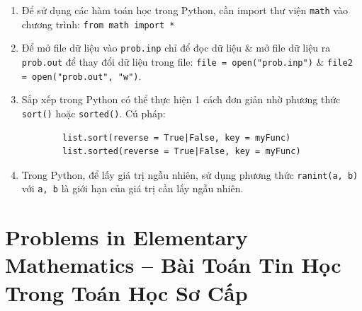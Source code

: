 \documentclass{article}
\begin{document}
\begin{enumerate}
	\item Để sử dụng các hàm toán học trong Python, cần import thư viện \texttt{math} vào chương trình: \texttt{from math import *}
	\item Để mở file dữ liệu vào \texttt{prob.inp} chỉ để đọc dữ liệu \& mở file dữ liệu ra \texttt{prob.out} để thay đổi dữ liệu trong file: \texttt{file = open("prob.inp")} \& \texttt{file2 = open("prob.out", "w")}.
	\item Sắp xếp trong Python có thể thực hiện 1 cách đơn giản nhờ phương thức \texttt{sort()} hoặc \texttt{sorted()}. Cú pháp:
	\begin{verbatim}
		list.sort(reverse = True|False, key = myFunc)
		list.sorted(reverse = True|False, key = myFunc)
	\end{verbatim}
	\item Trong Python, để lấy giá trị ngẫu nhiên, sử dụng phương thức \texttt{ranint(a, b)} với \texttt{a, b} là giới hạn của giá trị cần lấy ngẫu nhiên.
\end{enumerate}


\section{Problems in Elementary Mathematics  -- Bài Toán Tin Học Trong Toán Học Sơ Cấp}
\end{document}
